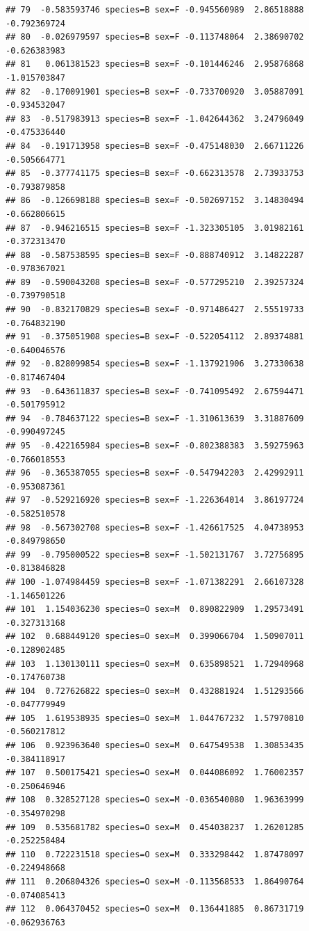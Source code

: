 \documentclass{beamer}\usepackage[]{graphicx}\usepackage[]{color}
\makeatletter
\newenvironment{kframe}{%
 \def\at@end@of@kframe{}%
 \ifinner\ifhmode%
  \def\at@end@of@kframe{\end{minipage}}%
  \begin{minipage}{\columnwidth}%
 \fi\fi%
 \def\FrameCommand##1{\hskip\@totalleftmargin \hskip-\fboxsep
 \colorbox{shadecolor}{##1}\hskip-\fboxsep
     \hskip-\linewidth \hskip-\@totalleftmargin \hskip\columnwidth}%
 \MakeFramed {\advance\hsize-\width
   \@totalleftmargin\z@ \linewidth\hsize
   \@setminipage}}%
 {\par\unskip\endMakeFramed%
 \at@end@of@kframe}
\newenvironment{knitrout}{}{} %
\makeatother
\begin{document}
\begin{frame}[fragile]
\begin{knitrout}
\begin{kframe}
\begin{verbatim}
## 79  -0.583593746 species=B sex=F -0.945560989  2.86518888    -0.792369724
## 80  -0.026979597 species=B sex=F -0.113748064  2.38690702    -0.626383983
## 81   0.061381523 species=B sex=F -0.101446246  2.95876868    -1.015703847
## 82  -0.170091901 species=B sex=F -0.733700920  3.05887091    -0.934532047
## 83  -0.517983913 species=B sex=F -1.042644362  3.24796049    -0.475336440
## 84  -0.191713958 species=B sex=F -0.475148030  2.66711226    -0.505664771
## 85  -0.377741175 species=B sex=F -0.662313578  2.73933753    -0.793879858
## 86  -0.126698188 species=B sex=F -0.502697152  3.14830494    -0.662806615
## 87  -0.946216515 species=B sex=F -1.323305105  3.01982161    -0.372313470
## 88  -0.587538595 species=B sex=F -0.888740912  3.14822287    -0.978367021
## 89  -0.590043208 species=B sex=F -0.577295210  2.39257324    -0.739790518
## 90  -0.832170829 species=B sex=F -0.971486427  2.55519733    -0.764832190
## 91  -0.375051908 species=B sex=F -0.522054112  2.89374881    -0.640046576
## 92  -0.828099854 species=B sex=F -1.137921906  3.27330638    -0.817467404
## 93  -0.643611837 species=B sex=F -0.741095492  2.67594471    -0.501795912
## 94  -0.784637122 species=B sex=F -1.310613639  3.31887609    -0.990497245
## 95  -0.422165984 species=B sex=F -0.802388383  3.59275963    -0.766018553
## 96  -0.365387055 species=B sex=F -0.547942203  2.42992911    -0.953087361
## 97  -0.529216920 species=B sex=F -1.226364014  3.86197724    -0.582510578
## 98  -0.567302708 species=B sex=F -1.426617525  4.04738953    -0.849798650
## 99  -0.795000522 species=B sex=F -1.502131767  3.72756895    -0.813846828
## 100 -1.074984459 species=B sex=F -1.071382291  2.66107328    -1.146501226
## 101  1.154036230 species=O sex=M  0.890822909  1.29573491    -0.327313168
## 102  0.688449120 species=O sex=M  0.399066704  1.50907011    -0.128902485
## 103  1.130130111 species=O sex=M  0.635898521  1.72940968    -0.174760738
## 104  0.727626822 species=O sex=M  0.432881924  1.51293566    -0.047779949
## 105  1.619538935 species=O sex=M  1.044767232  1.57970810    -0.560217812
## 106  0.923963640 species=O sex=M  0.647549538  1.30853435    -0.384118917
## 107  0.500175421 species=O sex=M  0.044086092  1.76002357    -0.250646946
## 108  0.328527128 species=O sex=M -0.036540080  1.96363999    -0.354970298
## 109  0.535681782 species=O sex=M  0.454038237  1.26201285    -0.252258484
## 110  0.722231518 species=O sex=M  0.333298442  1.87478097    -0.224948668
## 111  0.206804326 species=O sex=M -0.113568533  1.86490764    -0.074085413
## 112  0.064370452 species=O sex=M  0.136441885  0.86731719    -0.062936763

\end{verbatim}
\end{kframe}
\end{knitrout}
\end{frame}
\end{document}
